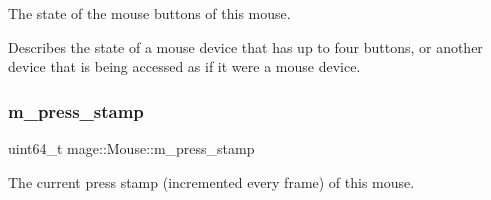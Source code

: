 The state of the mouse buttons of this mouse.

Describes the state of a mouse device that has up to four buttons, or another device that is being accessed as if it were a mouse device. \hypertarget{classmage_1_1_mouse_a32b30d3c37a2082869f4ff4f522dfbf8}{}\label{classmage_1_1_mouse_a32b30d3c37a2082869f4ff4f522dfbf8} 
\subsubsection{\texorpdfstring{m\+\_\+press\+\_\+stamp}{m\_press\_stamp}}
{\footnotesize\ttfamily uint64\+\_\+t mage\+::\+Mouse\+::m\+\_\+press\+\_\+stamp\hspace{0.3cm}{\ttfamily [private]}}

The current press stamp (incremented every frame) of this mouse. 